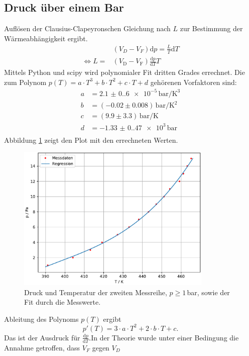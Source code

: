 \subsection{Druck über einem Bar}
Auflösen der Clausius-Clapeyronschen Gleichung nach $L$ zur Bestimmung der Wärmeabhängigkeit ergibt.\\
\begin{align}
  &(V_D-V_F)\text{d}p=\frac{L}{T}\text{d}T\nonumber\\
  \Leftrightarrow L=&(V_\text{D}-V_\text{F})\frac{\text{d}p}{\text{d}T}T\label{eqn:L(V,T)}
\end{align}
Mittels Python und scipy wird polynomialer Fit dritten Grades errechnet. Die 
zum Polynom $p(T)=a\cdot T^3+b\cdot T^2+c\cdot T+d$ gehörenen Vorfaktoren sind:
\begin{align*}
  a &= \num{2.1(0.6)e-5}\,\si{\bar\per\kelvin\cubed}\\
  b &= (-0.02 ± 0.008)\,\si{\bar\per\kelvin\squared}\\
  c &= (9.9 ± 3.3)\,\si{\bar\per\kelvin}\\
  d &= \num{-1.33(0.47)e3}\,\si{\bar}\\
\end{align*}
Abbildung \ref{fig:Druck_groß} zeigt den Plot mit den errechneten Werten.
\begin{figure}[H]
\centering
\includegraphics[height=7cm]{plotd.pdf}
\caption{Druck und Temperatur der zweiten Messreihe, $p\geq 1$\,bar, sowie 
der Fit durch die Messwerte.}
\label{fig:Druck_groß}
\end{figure}
Ableitung des Polynoms $p(T)$ ergibt
\begin{equation}
p'(T)=3\cdot a\cdot T^2+2\cdot b\cdot T+c.
\end{equation}
Das ist der Ausdruck für $\frac{\text{d}p}{\text{d}T}$.In der Theorie wurde unter einer Bedingung die Annahme getroffen, dass $V_F$ gegen $V_D$
